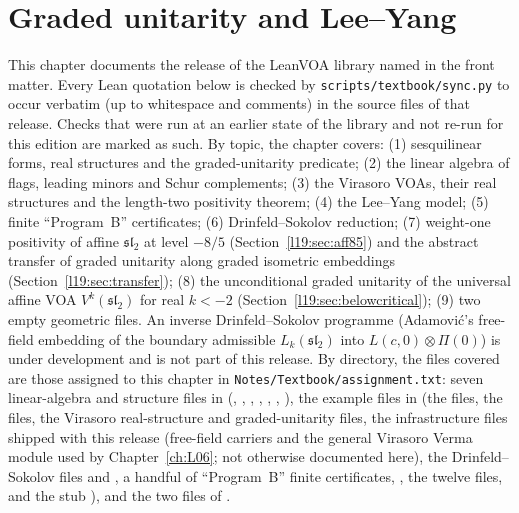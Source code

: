 \chapter{Graded unitarity and Lee--Yang}
\label{ch:L19}
\begingroup\setlength{\emergencystretch}{3em}

\providecommand{\lnineteenvac}{\mathbf{1}}
\providecommand{\lnineteenV}{\mathcal{V}}
\providecommand{\lnineteenL}{L}
\providecommand{\lnineteenG}{G}
\providecommand{\lnineteenLay}{\mathcal{L}}
\providecommand{\lnineteenh}{\langle\!\langle}
\providecommand{\lnineteenhr}{\rangle\!\rangle}
\providecommand{\lnineteencb}{c_{2,2n+1}}
\providecommand{\lnineteenPi}{\Pi}
\providecommand{\lnineteensl}{\mathfrak{sl}_2}
\providecommand{\lnineteenR}{\mathbb{R}}

This chapter documents the release of the LeanVOA library named in the front matter. Every Lean quotation below is checked by \texttt{scripts/textbook/sync.py}
to occur verbatim (up to whitespace and comments) in the source files of that release. Checks that were
run at an earlier state of the library and not re-run for this edition are marked as such. By topic, the chapter covers: (1) sesquilinear forms, real structures and the
graded-unitarity predicate; (2) the linear algebra of flags, leading minors and Schur complements; (3) the
Virasoro VOAs, their real structures and the length-two positivity theorem; (4) the Lee--Yang model;
(5) finite ``Program~B'' certificates; (6) Drinfeld--Sokolov reduction;
(7) weight-one positivity of affine $\lnineteensl$ at level $-8/5$ (Section~\ref{l19:sec:aff85}) and the abstract
transfer of graded unitarity along graded isometric embeddings (Section~\ref{l19:sec:transfer}); (8) the unconditional graded unitarity
of the universal affine VOA $V^k(\lnineteensl)$ for real $k<-2$ (Section~\ref{l19:sec:belowcritical}); (9) two
empty geometric files. An inverse Drinfeld--Sokolov programme (Adamovi\'c's free-field embedding of the boundary
admissible $L_k(\lnineteensl)$ into $L(c,0)\otimes\lnineteenPi(0)$) is under development and is not part of this
release.
By directory, the files covered are those
assigned to this chapter in
\texttt{Notes/Textbook/assignment.txt}: seven linear-algebra and structure files in
 (, ,
, , ,
, ),
the example files in  (the  files, the
 files, the Virasoro real-structure and graded-unitarity files, the
 infrastructure files shipped with this release (free-field carriers and the general
Virasoro Verma module used by Chapter~\ref{ch:L06}; not otherwise documented here), the Drinfeld--Sokolov files
 and , a handful of ``Program~B'' finite certificates,
, the twelve  files, and the stub
), and the two files of .

